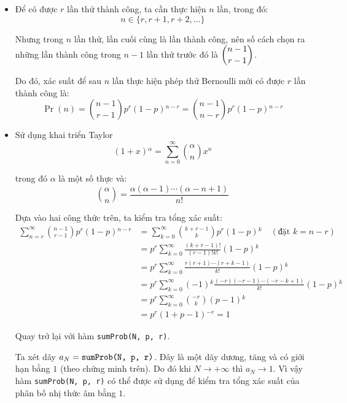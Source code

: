 \documentclass{article}
\begin{document}
\begin{itemize}
    \item Để có được $r$ lần thử thành công, ta cần thực hiện $n$ lần, trong đó:
        \[ n\in\{ r, r + 1, r + 2, \ldots \} \]
        \par Nhưng trong $n$ lần thử, lần cuối cùng là lần thành công, nên số cách chọn ra những lần thành công trong $n - 1$ lần thử trước đó là $\dbinom{n - 1}{r - 1}$.
        \par Do đó, xác suất để sau $n$ lần thực hiện phép thử Bernoulli mới có được $r$ lần thành công là:
        \[ \Pr(n) = \binom{n - 1}{r - 1}p^{r}(1 - p){}^{n - r} = \binom{n - 1}{n - r}p^{r}(1 - p){}^{n - r} \]
    \item Sử dụng khai triển Taylor
        \[ (1 + x){}^{\alpha} = \sum^{\infty}_{n=0}\binom{\alpha}{n}x^{n}  \]
        \par trong đó $\alpha$ là một số thực và:
        \[ \binom{\alpha}{n} = \frac{\alpha(\alpha - 1)\cdots (\alpha - n + 1)}{n!} \]
        \par Dựa vào hai công thức trên, ta kiểm tra tổng xác suất:
        \begin{align*}
            \sum^{\infty}_{n=r}\binom{n-1}{r-1}p^{r}(1-p){}^{n-r} &= \sum^{\infty}_{k=0}\binom{k + r - 1}{k}p^{r}(1-p){}^{k}\quad(\text{đặt }k = n - r) \\
                                                                &= p^{r}\sum^{\infty}_{k=0}\frac{(k + r - 1)!}{(r - 1)!k!}(1 - p){}^{k} \\
                                                                &= p^{r}\sum^{\infty}_{k=0}\frac{r(r+1)\cdots (r + k - 1)}{k!}(1-p){}^{k} \\
                                                                &= p^{r}\sum^{\infty}_{k=0}(-1){}^{k}\frac{(-r)(-r - 1)\cdots (-r -k + 1)}{k!}(1-p){}^{k} \\
                                                                &= p^{r}\sum^{\infty}_{k=0}\binom{-r}{k}(p-1){}^{k} \\
                                                                &= p^{r}(1 + p - 1){}^{-r} = 1
        \end{align*}
        \par Quay trở lại với hàm \texttt{sumProb(N, p, r)}.
        \par Ta xét dãy $a_{N} = \text{\texttt{sumProb(N, p, r)}}$. Đây là một dãy dương, tăng và có giới hạn bằng $1$ (theo chứng minh trên). Do đó khi $N\to{+\infty}$ thì $a_{N}\to 1$. Vì vậy hàm \texttt{sumProb(N, p, r)} có thể được sử dụng để kiểm tra tổng xác suất của phân bố nhị thức âm bằng $1$.
\end{itemize}
\end{document}
